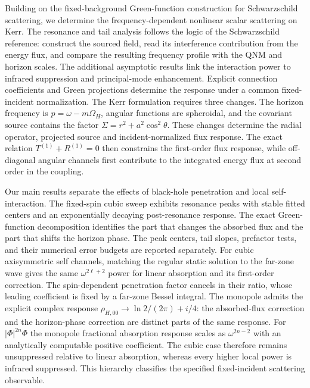 \documentclass[aps,prd,twocolumn,10pt,nofootinbib,superscriptaddress,floatfix]{revtex4-2}
\begin{document}
Building on the fixed-background Green-function construction for
Schwarzschild scattering\cite{HeTianZhangManuscript2026}, we determine the
frequency-dependent nonlinear scalar scattering on Kerr.
The resonance and tail analysis follows the logic of the Schwarzschild
reference: construct the sourced field, read its interference contribution
from the energy flux, and compare the resulting frequency profile with the
QNM and horizon scales.  The additional asymptotic results link the
interaction power to infrared suppression and principal-mode enhancement.
Explicit connection coefficients and Green projections determine the
response under a common fixed-incident normalization.
The Kerr formulation requires three changes.  The horizon
frequency is $p=\omega-m\Omega_H$, angular functions are spheroidal, and the
covariant source contains the factor $\Sigma=r^2+a^2\cos^2\theta$.  These
changes determine the radial operator, projected source and incident-normalized
flux response.
The exact relation $T^{(1)}+R^{(1)}=0$ then constrains the first-order flux
response, while off-diagonal angular channels first contribute to the
integrated energy flux at second order in the coupling.

Our main results separate the effects of black-hole penetration and local
self-interaction.  The fixed-spin cubic sweep exhibits resonance peaks
with stable fitted centers and an exponentially decaying post-resonance
response.  The exact Green-function decomposition identifies the part that
changes the absorbed flux and the part that shifts the horizon phase.
The peak centers, tail slopes, prefactor tests, and their numerical error
budgets are reported separately.  For cubic axisymmetric self channels, matching
the regular static solution to the far-zone wave gives the same
$\omega^{2\ell+2}$ power for linear absorption and its first-order
correction.  The spin-dependent penetration factor cancels in their ratio,
whose leading coefficient is fixed by a far-zone Bessel integral.
The monopole admits the explicit complex response
$\rho_{H,00}\to\ln2/(2\pi)+i/4$: the absorbed-flux correction and the
horizon-phase correction are distinct parts of the same response.
For $|\Phi|^{2n}\Phi$ the monopole fractional absorption response
scales as $\omega^{2n-2}$ with an analytically computable positive
coefficient.  The cubic case therefore remains unsuppressed relative to
linear absorption, whereas every higher local power is infrared
suppressed.  This hierarchy classifies the specified fixed-incident
scattering observable.
\end{document}

